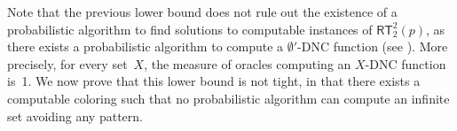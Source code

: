 \documentclass{article}
\newcommand{\RT}[0]{\mathsf{RT}}
\newcommand{\NN}[0]{\mathbb{N}}
\def\NN{\mathbb{N}}
\newtheorem{theorem}{Theorem}
\numberwithin{theorem}{section}
\theoremstyle{definition}
\begin{document}
Note that the previous lower bound does not rule out the existence of a probabilistic algorithm to find solutions to computable instances of $\RT^2_2(p)$, as there exists a probabilistic algorithm to compute a $\emptyset'$-DNC function (see ). More precisely, for every set~$X$, the measure of oracles computing an $X$-DNC function is~1. We now prove that this lower bound is not tight, in that there exists a computable coloring such that no probabilistic algorithm can compute an infinite set avoiding any pattern.

\end{document}
